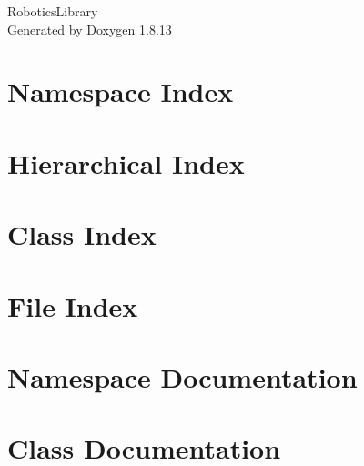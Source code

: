 \documentclass[twoside]{book}
\newcommand{\+}{\discretionary{\mbox{\scriptsize$\hookleftarrow$}}{}{}}
\newcommand{\clearemptydoublepage}{%
  \newpage{\pagestyle{empty}\cleardoublepage}%
}
\begin{document}
\hypersetup{pageanchor=false,
             bookmarksnumbered=true,
             pdfencoding=unicode
            }
\begin{titlepage}
\vspace*{7cm}
\begin{center}%
{\Large Robotics\+Library }\\
\vspace*{1cm}
{\large Generated by Doxygen 1.8.13}\\
\end{center}
\end{titlepage}
\clearemptydoublepage
{}
\tableofcontents
\clearemptydoublepage
{}
\hypersetup{pageanchor=true}

\chapter{Namespace Index}

\chapter{Hierarchical Index}

\chapter{Class Index}

\chapter{File Index}

\chapter{Namespace Documentation}








\chapter{Class Documentation}













\end{document}
